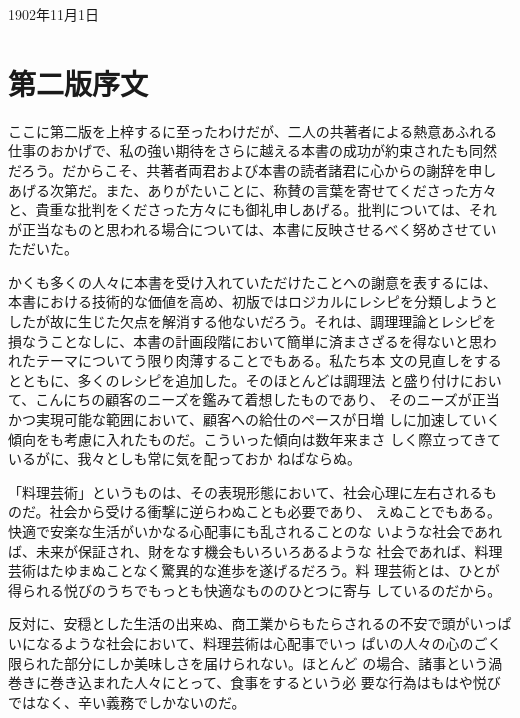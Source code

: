 1902年11月1日

\newpage

\hypertarget{ux7b2cux4e8cux7248ux5e8fux6587}{%
\section{第二版序文}\label{ux7b2cux4e8cux7248ux5e8fux6587}}

\vspace*{1.7\zw}

ここに第二版を上梓するに至ったわけだが、二人の共著者による熱意あふれる
仕事のおかげで、私の強い期待をさらに越える本書の成功が約束されたも同然
だろう。だからこそ、共著者両君および本書の読者諸君に心からの謝辞を申し
あげる次第だ。また、ありがたいことに、称賛の言葉を寄せてくださった方々
と、貴重な批判をくださった方々にも御礼申しあげる。批判については、それ
が正当なものと思われる場合については、本書に反映させるべく努めさせてい
ただいた。

かくも多くの人々に本書を受け入れていただけたことへの謝意を表するには、
本書における技術的な価値を高め、初版ではロジカルにレシピを分類しようと
したが故に生じた欠点を解消する他ないだろう。それは、調理理論とレシピを
損なうことなしに、本書の計画段階において簡単に済まさざるを得ないと思わ
れたテーマについてう限り肉薄することでもある。私たち本
文の見直しをするとともに、多くのレシピを追加した。そのほとんどは調理法
と盛り付けにおいて、こんにちの顧客のニーズを鑑みて着想したものであり、
そのニーズが正当かつ実現可能な範囲において、顧客への給仕のペースが日増
しに加速していく傾向をも考慮に入れたものだ。こういった傾向は数年来まさ
しく際立ってきているがに、我々としも常に気を配っておか
ねばならぬ。

「料理芸術」というものは、その表現形態において、社会心理に左右されるも
のだ。社会から受ける衝撃に逆らわぬことも必要であり、
えぬことでもある。快適で安楽な生活がいかなる心配事にも乱されることのな
いような社会であれば、未来が保証され、財をなす機会もいろいろあるような
社会であれば、料理芸術はたゆまぬことなく驚異的な進歩を遂げるだろう。料
理芸術とは、ひとが得られる悦びのうちでもっとも快適なもののひとつに寄与
しているのだから。

反対に、安穏とした生活の出来ぬ、商工業からもたらされるの不安で頭がいっぱいになるような社会において、料理芸術は心配事でいっ
ぱいの人々の心のごく限られた部分にしか美味しさを届けられない。ほとんど
の場合、諸事という渦巻きに巻き込まれた人々にとって、食事をするという必
要な行為はもはや悦びではなく、辛い義務でしかないのだ。

